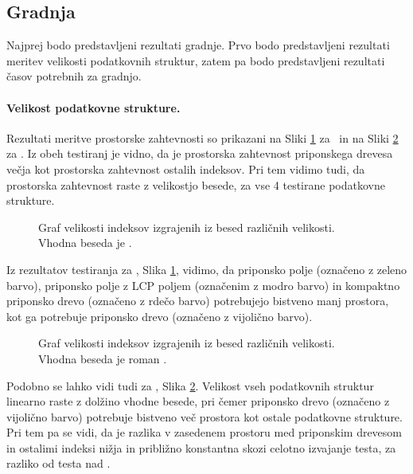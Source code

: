 \subsection{Gradnja}
Najprej bodo predstavljeni rezultati gradnje. Prvo bodo predstavljeni rezultati meritev velikosti podatkovnih struktur, zatem pa bodo predstavljeni rezultati časov potrebnih za gradnjo.

\paragraph{Velikost podatkovne strukture.}

Rezultati meritve prostorske zahtevnosti so prikazani na Sliki \ref{fig:VelikostGraf} za \DNK\ in na Sliki \ref{fig:VelikostGrafSLO} za \NK. Iz obeh testiranj je vidno, da je prostorska zahtevnost priponskega drevesa večja kot prostorska zahtevnost ostalih indeksov. Pri tem vidimo tudi, da prostorska zahtevnost raste z velikostjo besede, za vse 4 testirane podatkovne strukture.

\begin{figure}[htb]
    \centering
    
    \caption{Graf velikosti indeksov izgrajenih iz besed različnih velikosti. Vhodna beseda je \DNK.} 
    \label{fig:VelikostGraf}
\end{figure}

Iz rezultatov testiranja za \DNK, Slika \ref{fig:VelikostGraf}, vidimo, da priponsko polje (označeno z zeleno barvo), priponsko polje z LCP poljem (označenim z modro barvo) in kompaktno priponsko drevo (označeno z rdečo barvo) potrebujejo bistveno manj prostora, kot ga potrebuje priponsko drevo (označeno z vijolično barvo).

\begin{figure}[tb]
    \centering
    
    \caption{Graf velikosti indeksov izgrajenih iz besed različnih velikosti. Vhodna beseda je roman \NK.} 
    \label{fig:VelikostGrafSLO}
\end{figure}

Podobno se lahko vidi tudi za \NK, Slika \ref{fig:VelikostGrafSLO}. Velikost vseh podatkovnih struktur linearno raste z dolžino vhodne besede, pri čemer priponsko drevo (označeno z vijolično barvo) potrebuje bistveno več prostora kot ostale podatkovne strukture. Pri tem pa se vidi, da je razlika v zasedenem prostoru med priponskim drevesom in ostalimi indeksi nižja in približno konstantna skozi celotno izvajanje testa, za razliko od testa nad \DNK.


